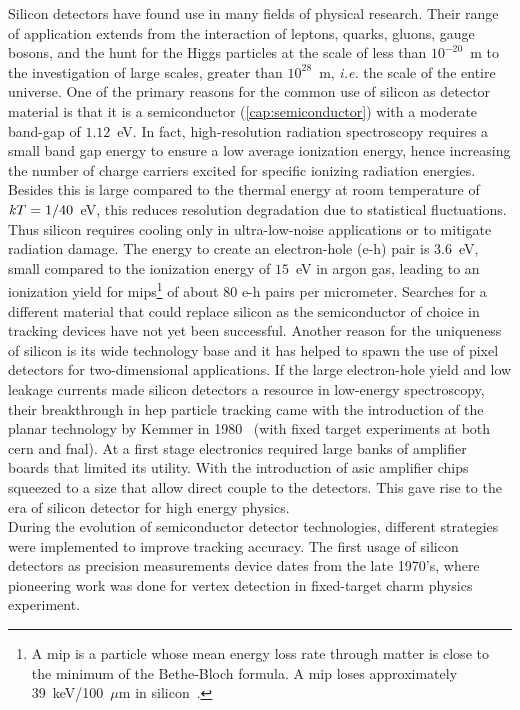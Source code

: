 Silicon detectors have found use in many fields of physical research. Their
range of application extends from the interaction of leptons, quarks, gluons,
gauge bosons, and the hunt for the Higgs particles at the scale of less than
$10^{-20}$~m to the investigation of large scales, greater than $10^{28}$~m,
{\em i.e.} the scale of the entire universe. One of the primary reasons for the
common use of silicon as detector material is that it is a semiconductor
(\ref{cap:semiconductor}) with a moderate band-gap of $1.12$~eV. In fact,
high-resolution radiation spectroscopy requires a small band gap energy to
ensure a low average ionization energy, hence increasing the number of charge
carriers excited for specific ionizing radiation energies. Besides this is large
compared to the thermal energy at room temperature of ${\it k}T=1/40$~eV, this
reduces resolution degradation due to statistical fluctuations. Thus silicon
requires cooling only in ultra-low-noise applications or to mitigate radiation
damage. The energy to create an electron-hole (e-h) pair is $3.6$~eV, small
compared to the ionization energy of $15$~eV in argon gas, leading to an
ionization yield for \glspl{mip}\footnote{A \gls{mip} is a particle whose mean
  energy loss rate through matter is close to the minimum of the Bethe-Bloch
  formula. A \gls{mip} loses approximately 39~keV/100~$\mu$m in
  silicon~\cite{Leo}. } of about 80 e-h pairs per micrometer. Searches for a
different material that could replace silicon as the semiconductor of choice in
tracking devices have not yet been successful. Another reason for the uniqueness
of silicon is its wide technology base and it has helped to spawn the use of
pixel detectors for two-dimensional applications. If the large electron-hole
yield and low leakage currents made silicon detectors a resource in low-energy
spectroscopy, their breakthrough in \gls{hep} particle tracking came with the
introduction of the planar technology by Kemmer in 1980~\cite{Kemmer_a} (with
fixed target experiments at both \gls{cern} and \gls{fnal}). At a first stage
electronics required large banks of amplifier boards that limited its
utility. With the introduction of \gls{asic} amplifier chips squeezed to a size
that allow direct couple to the detectors. This gave rise to
the era of silicon detector for high energy physics.\\
During the evolution of semiconductor detector technologies, different
strategies were implemented to improve tracking accuracy. The first usage of
silicon detectors as precision measurements device dates from the late 1970's,
where pioneering work was done for vertex detection in fixed-target charm
physics experiment.

